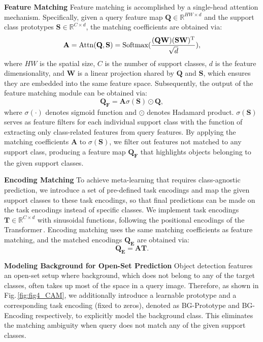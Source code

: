 \documentclass[letterpaper]{article} \usepackage{aaai22}  \usepackage{times}  \usepackage{helvet}  \usepackage{courier}  \usepackage[hyphens]{url}  \usepackage{graphicx} \urlstyle{rm} \def\UrlFont{\rm}  \usepackage{natbib}  \usepackage{caption} \DeclareCaptionStyle{ruled}{labelfont=normalfont,labelsep=colon,strut=off} \frenchspacing  \setlength{\pdfpagewidth}{8.5in}  \setlength{\pdfpageheight}{11in}  \usepackage{algorithm}
\begin{document}
\smallskip
\vspace{+1.00mm}
\noindent\textbf{Feature Matching \;}
Feature matching is accomplished by a single-head attention mechanism. Specifically, given a query feature map $\mathbf{Q} \in \mathbb{R}^{HW \times d}$ and the support class prototypes $\mathbf{S} \in \mathbb{R}^{C \times d}$, the matching coefficients are obtained via:
\begin{equation}
\mathbf{A} = {\rm Attn}(\mathbf{Q}, \mathbf{S}) = {\rm Softmax}(\frac{(\mathbf{Q W})(\mathbf{S W})^{\rm T}}{\sqrt{d}}),
\end{equation}
where $HW$ is the spatial size, $C$ is the number of support classes, $d$ is the feature dimensionality, and $\mathbf{W}$ is a linear projection shared by $\mathbf{Q}$ and $\mathbf{S}$, which ensures they are embedded into the same feature space. Subsequently, the output of the feature matching module can be obtained via:
\begin{equation}
\mathbf{Q}_{\mathbf{F}} = \mathbf{A} \sigma(\mathbf{S}) \odot \mathbf{Q},
\end{equation}
where $\sigma(\cdot)$ denotes sigmoid function and $\odot$ denotes Hadamard product. $\sigma(\mathbf{S})$ serves as feature filters for each individual support class with the function of extracting only class-related features from query features. By applying the matching coefficients $\mathbf{A}$ to $\sigma(\mathbf{S})$, we filter out features not matched to any support class, producing a feature map $\mathbf{Q_F}$ that highlights objects belonging to the given support classes.


\smallskip
\vspace{+1.00mm}
\noindent\textbf{Encoding Matching\;\;}
To achieve meta-learning that requires class-agnostic prediction, we introduce a set of pre-defined task encodings and map the given support classes to these task encodings, so that final predictions can be made on the task encodings instead of specific classes. We implement task encodings $\mathbf{T} \in \mathbb{R}^{C \times d}$ with sinusoidal functions, following the positional encodings of the Transformer\,\cite{transformer}. Encoding matching uses the same matching coefficients as feature matching, and the matched encodings $\mathbf{Q_E}$ are obtained via:
\begin{equation}
\mathbf{Q}_{\mathbf{E}} = \mathbf{A} \mathbf{T}.
\end{equation}

\smallskip
\noindent\textbf{Modeling Background for Open-Set Prediction\;\;}
Object detection features an open-set setup where background, which does not belong to any of the target classes, often takes up most of the space in a query image. Therefore, as shown in Fig.\,\ref{fig:fig4_CAM}, we additionally introduce a learnable prototype and a corresponding task encoding (fixed to zeros), denoted as BG-Prototype and BG-Encoding respectively, to explicitly model the background class. This eliminates the matching ambiguity when query does not match any of the given support classes.
\end{document}
